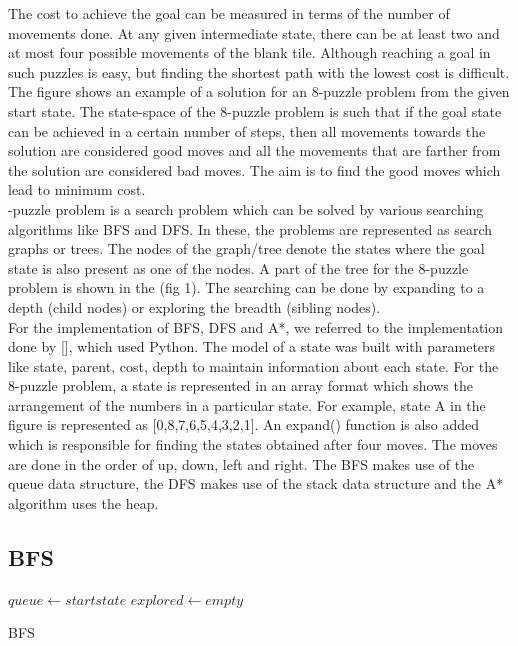 \documentclass{svproc}
\begin{document}
\noindent The cost to achieve the goal can be measured in terms of the number of movements done. At any given intermediate state, there can be at least two and at most four possible movements of the blank tile. Although reaching a goal in such puzzles is easy, but finding the shortest path with the lowest cost is difficult. The figure shows an example of a solution for an 8-puzzle problem from the given start state. The state-space of the 8-puzzle problem is such that if the goal state can be achieved in a certain number of steps, then all movements towards the solution are considered good moves and all the movements that are farther from the solution are considered bad moves. The aim is to find the good moves which lead to minimum cost. \\

-puzzle problem is a search problem which can be solved by various searching algorithms like BFS and DFS. In these, the problems are represented as search graphs or trees. The nodes of the graph/tree denote the states where the goal state is also present as one of the nodes. A part of the tree for the 8-puzzle problem is shown in the (fig 1). The searching can be done by expanding to a depth (child nodes) or exploring the breadth (sibling nodes). \\

\noindent For the implementation of BFS, DFS and A*, we referred to the implementation done by [], which used Python. The model of a state was built with parameters like state, parent, cost, depth to maintain information about each state. For the 8-puzzle problem, a state is represented in an array format which shows the arrangement of the numbers in a particular state. For example, state A in the figure is represented as [0,8,7,6,5,4,3,2,1]. An expand() function is also added which is responsible for finding the states obtained after four moves. The moves are done in the order of up, down, left and right. The BFS makes use of the queue data structure, the DFS makes use of the stack data structure and the A* algorithm uses the heap.

\subsection{BFS}
\setlength{\intextsep}{5pt}
\begin{algorithm}
	\SetAlgoLined
	 $queue \gets start state$\;
	 $explored \gets empty$\;
	\caption{BFS}
\end{algorithm}
\end{document}
